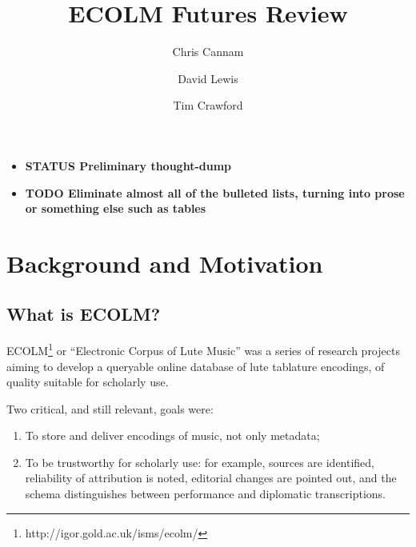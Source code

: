 \documentclass[sigconf, nonacm=true]{acmart}
\begin{document}
\title{ECOLM Futures Review}

\author{Chris Cannam}

\author{David Lewis}

\author{Tim Crawford}

\maketitle
\begin{sloppypar}
  

  \begin{itemize}
    \item {\bf STATUS Preliminary thought-dump}
    \item {\bf TODO Eliminate almost all of the bulleted lists, turning into
      prose or something else such as tables}
  \end{itemize}
  
  \section{Background and Motivation}

  \subsection{What is ECOLM?}

  ECOLM\footnote{http://igor.gold.ac.uk/isms/ecolm/} or ``Electronic
  Corpus of Lute Music'' was a series of research projects aiming to
  develop a queryable online database of lute tablature encodings, of
  quality suitable for scholarly use.

  Two critical, and still relevant, goals were:
  
  \begin{enumerate}
  \item To store and deliver encodings of music, not only metadata;
  \item To be trustworthy for scholarly use: for example, sources are
    identified, reliability of attribution is noted, editorial changes
    are pointed out, and the schema distinguishes between performance
    and diplomatic transcriptions.
  \end{enumerate}
  

\end{sloppypar}
\end{document}
